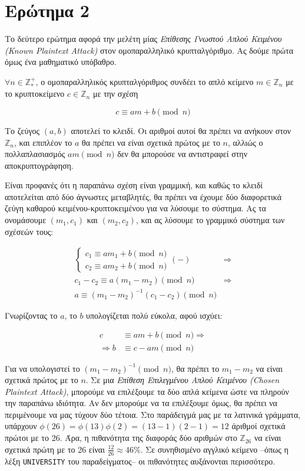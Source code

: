 \documentclass{article}
\begin{document}
\section*{Ερώτημα 2}

Το δεύτερο ερώτημα αφορά την μελέτη μίας \emph{Επίθεσης Γνωστού Απλού Κειμένου (Known Plaintext Attack)} στον ομοπαραλληλικό κρυπταλγόριθμο. Ας δούμε πρώτα όμως ένα μαθηματικό υπόβαθρο.

$\forall n \in \mathbb{Z}^+_*$, ο ομοπαραλληλικός κρυπταλγόριθμος συνδέει το απλό κείμενο $m \in \mathbb{Z}_n$ με το κρυπτοκείμενο $c \in \mathbb{Z}_n$ με την σχέση

$$c \equiv am + b \pmod n$$

Το ζεύγος $(a, b)$ αποτελεί το κλειδί. Οι αριθμοί αυτοί θα πρέπει να ανήκουν στον $\mathbb{Z}_n$, και επιπλέον το $a$ θα πρέπει να είναι σχετικά πρώτος με το $n$, αλλιώς ο πολλαπλασιασμός $am \pmod n$ δεν θα μπορούσε να αντιστραφεί στην αποκρυπτογράφηση.

Είναι προφανές ότι η παραπάνω σχέση είναι γραμμική, και καθώς το κλειδί αποτελείται από δύο άγνωστες μεταβλητές, θα πρέπει να έχουμε δύο διαφορετικά ζεύγη καθαρού κειμένου-κρυπτοκειμένου για να λύσουμε το σύστημα. Ας τα ονομάσουμε $(m_1, c_1)$ και $(m_2, c_2)$, και ας λύσουμε το γραμμικό σύστημα των σχέσεών τους:

\begin{equation} \label{crack_a}
\begin{split}
\begin{cases}
c_1 \equiv a m_1 + b \pmod n \\
c_2 \equiv a m_2 + b \pmod n
\end{cases} (-) &\Rightarrow \\
c_1 - c_2 \equiv a(m_1 - m_2) \pmod n &\Rightarrow \\
a \equiv (m_1 - m_2)^{-1} (c_1 - c_2) \pmod n
\end{split}
\end{equation}

Γνωρίζοντας το $a$, το $b$ υπολογίζεται πολύ εύκολα, αφού ισχύει:

\begin{align*}
c &\equiv am + b \pmod n \Rightarrow \\
\Rightarrow b &\equiv c - am \pmod n
\end{align*}

Για να υπολογιστεί το $(m_1 - m_2)^{-1} \pmod n$, θα πρέπει το $m_1 - m_2$ να είναι σχετικά πρώτος με το $n$. Σε μια \emph{Επίθεση Επιλεγμένου Απλού Κειμένου (Chosen Plaintext Attack)}, μπορούμε να επιλέξουμε τα δύο απλά κείμενα ώστε να πληρούν την παραπάνω ιδιότητα. Αν δεν μπορούμε να τα επιλέξουμε όμως, θα πρέπει να περιμένουμε να μας τύχουν δύο τέτοια. Στο παράδειγμά μας με τα λατινικά γράμματα, υπάρχουν $\phi(26) = \phi(13)\phi(2) = (13-1)(2-1) = 12$ άριθμοί σχετικά πρώτοι με το 26. Άρα, η πιθανότητα της διαφοράς δύο αριθμών στο $\mathbb{Z}_{26}$ να είναι σχετικά πρώτη με το 26 είναι $\frac{12}{26} \approx 46\%$. Σε συνηθισμένο αγγλικό κείμενο --όπως η λέξη \texttt{UNIVERSITY} του παραδείγματος-- οι πιθανότητες αυξάνονται περισσότερο.
\end{document}
